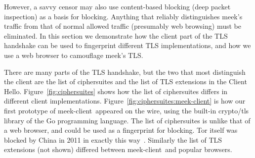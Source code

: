 \documentclass[conference]{IEEEtran}
\def\meekclient{\mbox{meek-client}}
\begin{document}
However, a savvy censor may also use content-based blocking
(deep packet inspection) as a basis for blocking.
Anything that reliably distinguishes meek's traffic from that of normal allowed traffic
(presumably web browsing) must be eliminated.
In this section we demonstrate how the client part of the TLS handshake can be used
to fingerprint different TLS implementations,
and how we use a web browser to camouflage meek's TLS.

There are many parts of the TLS handshake, but the two that
most distinguish the client are the list of ciphersuites and the
list of TLS extensions in the Client Hello.
Figure~\ref{fig:ciphersuites} shows how the list of ciphersuites
differs in different client implementations.
Figure~\ref{fig:ciphersuites:meek-client} is how our first prototype of \meekclient\ appeared on the wire,
using the built-in crypto/tls library of the Go programming language.
The list of ciphersuites is unlike that of a web browser,
and could be used as a fingerprint for blocking.
Tor itself was blocked by China in 2011 in exactly this way~\cite{bug4744}.
Similarly the list of TLS extensions (not shown)
differed between \meekclient\ and popular browsers.
\end{document}
